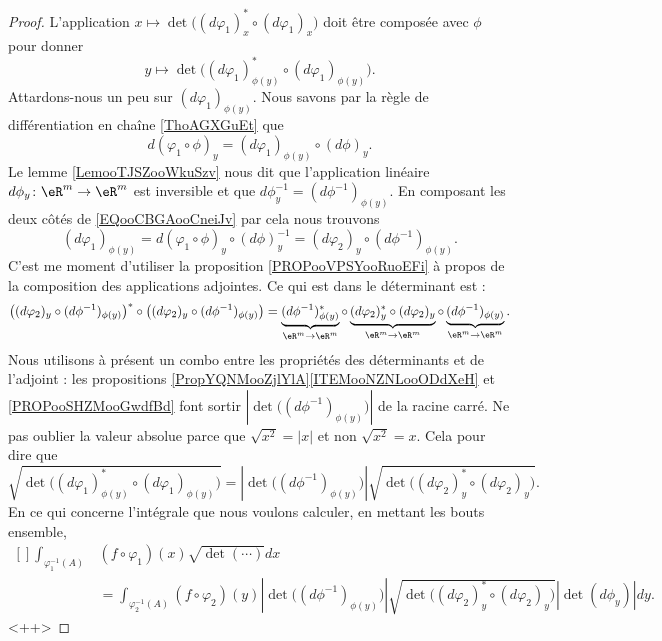 \begin{proof}
    L'application \( x\mapsto \det\big( (d\varphi_1)_x^*\circ(d\varphi_1)_x \big)\) doit être composée avec \( \phi\) pour donner
    \begin{equation}
        y\mapsto\det\big( (d\varphi_1)_{\phi(y)}^*\circ(d\varphi_1)_{\phi(y)} \big).
    \end{equation}
    Attardons-nous un peu sur \( (d\varphi_1)_{\phi(y)}\). Nous savons par la règle de différentiation en chaîne \ref{ThoAGXGuEt} que
    \begin{equation}        \label{EQooCBGAooCneiJv}
        d(\varphi_1\circ \phi)_y=(d\varphi_1)_{\phi(y)}\circ(d\phi)_y.
    \end{equation}
    Le lemme \ref{LemooTJSZooWkuSzv} nous dit que l'application linéaire \( d\phi_y\colon \eR^m\to \eR^m\) est inversible et que \( d\phi_y^{-1}=(d\phi^{-1})_{\phi(y)}\). En composant les deux côtés de \eqref{EQooCBGAooCneiJv} par cela nous trouvons
    \begin{equation}
        (d\varphi_1)_{\phi(y)}=d(\varphi_1\circ\phi)_y\circ(d\phi)_y^{-1}=(d\varphi_2)_y\circ(d\phi^{-1})_{\phi(y)}.
    \end{equation}
    C'est me moment d'utiliser la proposition \ref{PROPooVPSYooRuoEFi} à propos de la composition des applications adjointes. Ce qui est dans le déterminant est :
    \begin{equation}
        \big( (d\varphi_2)_y\circ(d\phi^{-1})_{\phi(y)} \big)^*\circ\big( (d\varphi_2)_y\circ(d\phi^{-1})_{\phi(y)} \big)=
        \underbrace{(d\phi^{-1})_{\phi(y)}^*}_{\eR^m\to \eR^m}\circ\underbrace{(d\varphi_2)^*_y\circ(d\varphi_2)_y}_{\eR^m\to \eR^m}\circ\underbrace{(d\phi^{-1})_{\phi(y)}}_{\eR^m\to \eR^m}.
    \end{equation}
    Nous utilisons à présent un combo entre les propriétés des déterminants et de l'adjoint : les propositions \ref{PropYQNMooZjlYlA}\ref{ITEMooNZNLooODdXeH} et \ref{PROPooSHZMooGwdfBd} font sortir \( | \det\big( (d\phi^{-1})_{\phi(y)} \big) |\) de la racine carré. Ne pas oublier la valeur absolue parce que \( \sqrt{ x^2 }=| x |\) et non \( \sqrt{ x^2 }=x\). Cela pour dire que
    \begin{equation}
        \sqrt{ \det\big( (d\varphi_1)_{\phi(y)}^*\circ(d\varphi_1)_{\phi(y)} \big) }=| \det\big( (d\phi^{-1})_{\phi(y)} \big) |\sqrt{ \det\big( (d\varphi_2)_y^*\circ(d\varphi_2)_y \big) }.
    \end{equation}
    En ce qui concerne l'intégrale que nous voulons calculer, en mettant les bouts ensemble,
    \begin{equation}
        \begin{aligned}[]
        \int_{\varphi_1^{-1}(A)}&(f\circ\varphi_1)(x)\sqrt{ \det(\cdots) }dx\\
        &=\int_{\varphi^{-1}_2(A)}(f\circ\varphi_2)(y)| \det\big( (d\phi^{-1})_{\phi(y)} \big) |\sqrt{ \det\big( (d\varphi_2)_y^*\circ(d\varphi_2)_y \big) }| \det(d\phi_y) |dy.
        \end{aligned}
    \end{equation}
    <++>
\end{proof}


